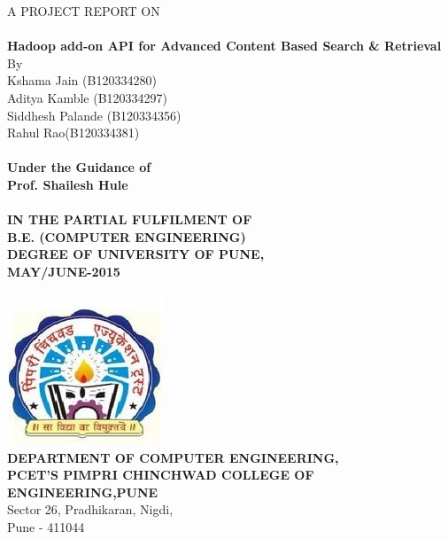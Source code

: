 
\newpage
\thispagestyle{empty}
\begin{center}
\large {A PROJECT REPORT ON} \\
\hfill \\
\large {\textbf{Hadoop add-on API for Advanced Content Based Search \& Retrieval}} \\

\large{By} \\

\hspace{0cm} \large{Kshama Jain} {(B120334280)}\\
\hspace{0cm} \large{Aditya Kamble} {(B120334297)}\\
\hspace{0cm} \large{Siddhesh Palande} {(B120334356)}\\
\hspace{0cm} \large{Rahul Rao}{(B120334381)}\\

\hfill \\
\textbf{Under the Guidance of\\
Prof. Shailesh Hule \\
\hfill \\
IN THE PARTIAL FULFILMENT OF \\
B.E. (COMPUTER ENGINEERING) \\
DEGREE OF UNIVERSITY OF PUNE, \\
MAY/JUNE-2015 }\\
\hfill \\
\includegraphics[scale=.30]{pccoe_logo.jpg} \\
     {\large {\textbf{DEPARTMENT OF COMPUTER ENGINEERING,}}} \\
      {\large \textbf{PCET'S PIMPRI CHINCHWAD COLLEGE OF ENGINEERING,PUNE}}\\
     {\large Sector 26, Pradhikaran, Nigdi,}\\
      {\large Pune - 411044}\\
\end{center}

